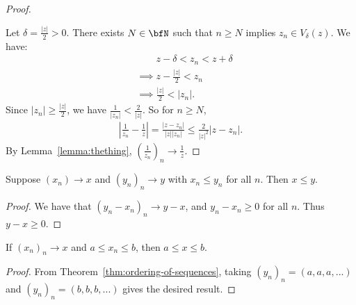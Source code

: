 \begin{proof}
\begin{center}
                \end{center}
            Let $\delta = \frac{|z|}{2} > 0$. There exists $N \in \bfN$ such that $n \geq N$ implies $z_n \in V_\delta(z)$. We have:
                \begin{equation*}
                \begin{split}
                    &\phantom{\implies} z - \delta < z_n < z + \delta \\
                    &\implies z - \frac{|z|}{2} < z_n \\
                    & \implies \frac{|z|}{2} < |z_n|.
                \end{split}
                \end{equation*}
            Since $|z_n| \geq \frac{|z|}{2}$, we have $\frac{1}{|z_n|} < \frac{2}{|z|}$. So for $n \geq N$, 
                \begin{equation*}
                \begin{split}
                    \left|\frac{1}{z_n} - \frac{1}{z}\right| = \frac{|z- z_n|}{|z||z_n|} \leq \frac{2}{|z|^2}|z - z_n|.
                \end{split}
                \end{equation*}
            By Lemma~\ref{lemma:thething}, $\left(\frac{1}{z_n}\right)_n \rightarrow \frac{1}{z}$.
        \end{proof}

    \begin{theorem}\label{thm:ordering-of-sequences}
        Suppose $(x_n) \rightarrow x$ and $(y_n)_n \rightarrow y$ with $x_n \leq y_n$ for all $n$. Then $x \leq y$.
    \end{theorem}
        \begin{proof}
            We have that $(y_n - x_n)_n \rightarrow y-x$, and $y_n - x_n \geq 0$ for all $n$. Thus $y - x \geq 0$.
        \end{proof}

    \begin{corollary}
        If $(x_n)_n \rightarrow x$ and $a \leq x_n \leq b$, then $a \leq x \leq b$.
    \end{corollary}
        \begin{proof}
            From Theorem~\ref{thm:ordering-of-sequences}, taking $(y_n)_n = (a,a,a,...)$ and $(y_n)_n = (b,b,b,...)$ gives the desired result.
        \end{proof}

